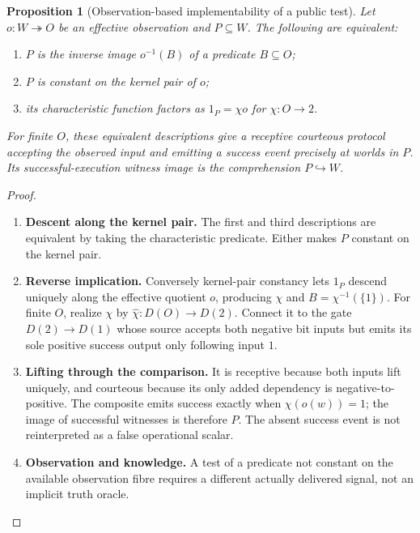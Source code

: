 \documentclass[11pt,a4paper]{article}
\numberwithin{equation}{section}
\newtheorem{proposition}[theorem]{Proposition}
\theoremstyle{definition}
\theoremstyle{remark}
\theoremstyle{plain}
\begin{document}
\begin{proposition}[Observation-based implementability of a public test]
\label{agt-prop-test-implementation}
Let $o:W\twoheadrightarrow O$ be an effective observation and
$P\subseteq W$.  The following are equivalent:
\begin{enumerate}[label=(\roman*),nosep]
\item $P$ is the inverse image $o^{-1}(B)$ of a predicate $B\subseteq O$;
\item $P$ is constant on the kernel pair of $o$;
\item its characteristic function factors as $1_P=\chi o$ for
      $\chi:O\to2$.
\end{enumerate}
For finite $O$, these equivalent descriptions give a receptive courteous
protocol accepting the observed input and emitting a success event precisely
at worlds in $P$.  Its successful-execution witness image is the
comprehension $P\hookrightarrow W$.
\end{proposition}
\begin{proof}
\leavevmode
\begin{enumerate}[label=\textup{(\arabic*)},leftmargin=*,itemsep=4pt,topsep=3pt]
  \item \textbf{Descent along the kernel pair.} The first and third descriptions are equivalent by taking the
characteristic predicate. Either makes $P$ constant on the kernel pair.
  \item \textbf{Reverse implication.} Conversely kernel-pair constancy lets $1_P$ descend uniquely along the
effective quotient $o$, producing $\chi$ and $B=\chi^{-1}(\{1\})$. For finite $O$, realize $\chi$ by
$\widehat\chi:D(O)\to D(2)$. Connect it to the gate
$D(2)\to D(1)$ whose source accepts both negative bit inputs but
emits its sole positive success output only following input $1$.
  \item \textbf{Lifting through the comparison.} It is receptive because both inputs lift uniquely, and courteous because
its only added dependency is negative-to-positive. The composite emits
success exactly when $\chi(o(w))=1$; the image of successful witnesses
is therefore $P$. The absent success event is not reinterpreted as a
false operational scalar.
  \item \textbf{Observation and knowledge.} A test of a predicate not constant on the
available observation fibre requires a different actually delivered signal,
not an implicit truth oracle.
\end{enumerate}
\end{proof}
\end{document}
